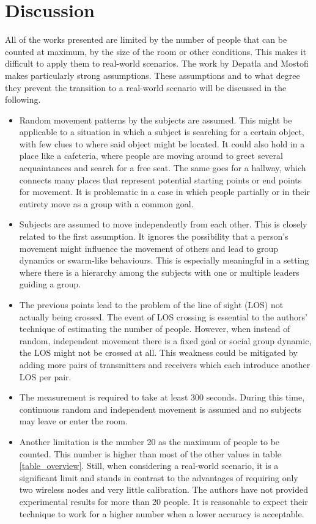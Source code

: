\documentclass[conference]{IEEEtran}
\begin{document}
\section{Discussion}
All of the works presented are limited by the number of people that can be counted at maximum, by the size of the room or other conditions. This makes it difficult to apply them to real-world scenarios. The work by Depatla and Mostofi \cite{DepatlaMostofi} makes particularly strong assumptions. These assumptions and to what degree they prevent the transition to a real-world scenario will be discussed in the following.
\begin{itemize}
\item Random movement patterns by the subjects are assumed. This might be applicable to a situation in which a subject is searching for a certain object, with few clues to where said object might be located. It could also hold in a place like a cafeteria, where people are moving around to greet several acquaintances and search for a free seat. The same goes for a hallway, which connects many places that represent potential starting points or end points for movement. It is problematic in a case in which people partially or in their entirety move as a group with a common goal.
\item Subjects are assumed to move independently from each other. This is closely related to the first assumption. It ignores the possibility that a person's movement might influence the movement of others and lead to group dynamics or swarm-like behaviours. This is especially meaningful in a setting where there is a hierarchy among the subjects with one or multiple leaders guiding a group.
\item The previous points lead to the problem of the line of sight (LOS) not actually being crossed. The event of LOS crossing is essential to the authors' technique of estimating the number of people. However, when instead of random, independent movement there is a fixed goal or social group dynamic, the LOS might not be crossed at all. This weakness could be mitigated by adding more pairs of transmitters and receivers which each introduce another LOS per pair.
\item The measurement is required to take at least 300 seconds. During this time, continuous random and independent movement is assumed and no subjects may leave or enter the room. 
\item Another limitation is the number 20 as the maximum of people to be counted. This number is higher than most of the other values in table \ref{table_overview}. Still, when considering a real-world scenario, it is a significant limit and stands in contrast to the advantages of requiring only two wireless nodes and very little calibration. The authors have not provided experimental results for more than 20 people. It is reasonable to expect their technique to work for a higher number when a lower accuracy is acceptable. 
\end{itemize}
\end{document}
